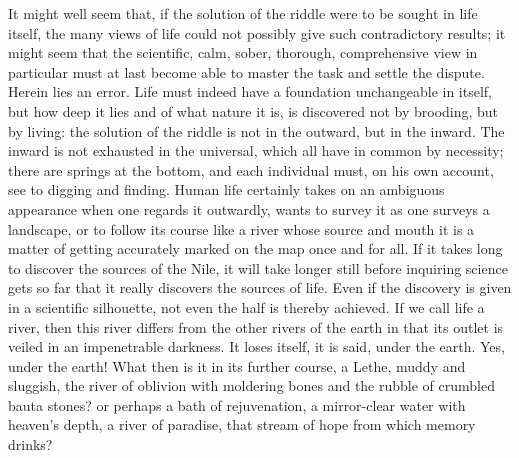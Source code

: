 \documentclass[12pt,a4paper,openany]{book}
\newcommand{\opage}[1]{\marginnote{\footnotesize\textit{[#1]}}}
\begin{document}
It might well seem that, if the solution of the riddle were to be sought in life itself, the many
views of life could not possibly give such contradictory results; it might seem that the scientific,
calm, sober, thorough, comprehensive view in particular must at last become able to master the task
and settle the dispute. Herein lies an error. Life must indeed have a foundation unchangeable in
itself, but how deep it lies and of what nature it is, is discovered not by brooding, but by living:
the solution of the riddle is not in the outward, but in the inward. The inward is not exhausted in
the universal, which all have in common by necessity; there are springs at the bottom, and each
individual must, on his own account, see to digging and finding. Human life
\setcounter{footnote}{0}%
\opage{11}certainly takes on an ambiguous appearance when one regards it outwardly, wants to survey it
as one surveys a landscape, or to follow its course like a river whose source and mouth it is a
matter of getting accurately marked on the map once and for all. If it takes long to discover the
sources of the Nile, it will take longer still before inquiring science gets so far that it really
discovers the sources of life. Even if the discovery is given in a scientific silhouette, not even
the half is thereby achieved. If we call life a river, then this river differs from the other
rivers of the earth in that its outlet is veiled in an impenetrable darkness. It loses itself, it is
said, under the earth. Yes, under the earth! What then is it in its further course, a Lethe, muddy
and sluggish, the river of oblivion with moldering bones and the rubble of crumbled bauta stones? or
perhaps a bath of rejuvenation, a mirror-clear water with heaven's depth, a river of paradise, that
stream of hope from which memory drinks?
\end{document}
